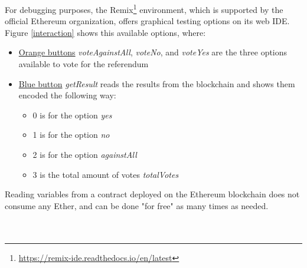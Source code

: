 \documentclass[10pt]{article}
\begin{document}
\begin{multicols}{2}
For debugging purposes, the Remix\footnote{\url{https://remix-ide.readthedocs.io/en/latest}} environment, which is supported by the official Ethereum organization, offers graphical testing options on its web IDE. Figure \ref{interaction} shows this available options, where:

\begin{itemize}
	\item \underline{Orange buttons} \textit{voteAgainstAll}, \textit{voteNo}, and \textit{voteYes} are the three options available to vote for the referendum
	\item \underline{Blue button} \textit{getResult} reads the results from the blockchain and shows them encoded the following way:
	\begin{itemize}
		\item 0 is for the option \textit{yes}
		\item 1 is for the option \textit{no}
		\item 2 is for the option \textit{againstAll}
		\item 3 is the total amount of votes \textit{totalVotes}
	\end{itemize}
\end{itemize}

Reading variables from a contract deployed on the Ethereum blockchain does not consume any Ether, and can be done "for free" as many times as needed.\\

\\\\


\end{multicols}
\end{document}
